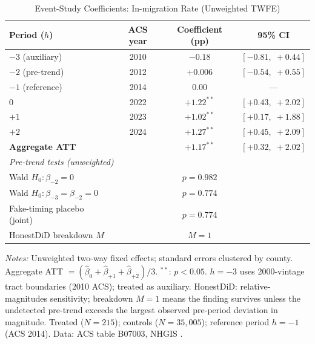 \documentclass[12pt]{article}
\begin{document}
\begin{table}[ht]
\centering
\caption{Event-Study Coefficients: In-migration Rate (Unweighted TWFE)}
\label{tab:decomp}
\small
\begin{tabular}{lccc}
\toprule
Period ($h$) & ACS year & Coefficient (pp) & 95\% CI \\
\midrule
$-3$ (auxiliary)   & 2010 & $-0.18$ & $[-0.81,\; +0.44]$ \\
$-2$ (pre-trend)   & 2012 & $+0.006$ & $[-0.54,\; +0.55]$ \\
$-1$ (reference)   & 2014 & $0.00$   & --- \\
$0$                & 2022 & $+1.22^{**}$ & $[+0.43,\; +2.02]$ \\
$+1$               & 2023 & $+1.02^{**}$ & $[+0.17,\; +1.88]$ \\
$+2$               & 2024 & $+1.27^{**}$ & $[+0.45,\; +2.09]$ \\
\midrule
\textbf{Aggregate ATT}    & & $\mathbf{+1.17}^{**}$ & $[+0.32,\; +2.02]$ \\
\midrule
\multicolumn{4}{l}{\textit{Pre-trend tests (unweighted)}} \\
Wald $H_0 \colon \beta_{-2} = 0$             & & $p = 0.982$ & \\
Wald $H_0 \colon \beta_{-3} = \beta_{-2} = 0$& & $p = 0.774$ & \\
Fake-timing placebo (joint)                   & & $p = 0.774$ & \\
HonestDiD breakdown $M$                       & & $M = 1$     & \\
\bottomrule
\end{tabular}
\medskip

\noindent\footnotesize
\textit{Notes:} Unweighted two-way fixed effects; standard errors clustered by county.
Aggregate ATT $= (\hat{\beta}_0 + \hat{\beta}_{+1} + \hat{\beta}_{+2}) / 3$.
$^{**}$: $p < 0.05$.
$h = -3$ uses 2000-vintage tract boundaries (2010 ACS); treated as auxiliary.
HonestDiD: \citet{rambachan2023more} relative-magnitudes sensitivity;
breakdown $M = 1$ means the finding survives unless the undetected pre-trend
exceeds the largest observed pre-period deviation in magnitude.
Treated ($N = 215$); controls ($N = 35{,}005$); reference period $h = -1$ (ACS 2014).
Data: ACS table B07003, NHGIS \citep{NHGIS2024}.
\end{table}
\end{document}
